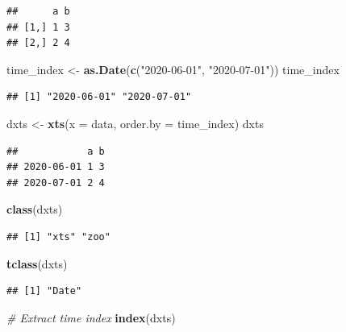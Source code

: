 \documentclass[
]{book}
\newenvironment{Shaded}{\begin{snugshade}}{\end{snugshade}}
\newcommand{\AttributeTok}[1]{\textcolor[rgb]{0.13,0.29,0.53}{#1}}
\newcommand{\CommentTok}[1]{\textcolor[rgb]{0.56,0.35,0.01}{\textit{#1}}}
\newcommand{\FunctionTok}[1]{\textcolor[rgb]{0.13,0.29,0.53}{\textbf{#1}}}
\newcommand{\NormalTok}[1]{#1}
\newcommand{\OtherTok}[1]{\textcolor[rgb]{0.56,0.35,0.01}{#1}}
\newcommand{\StringTok}[1]{\textcolor[rgb]{0.31,0.60,0.02}{#1}}
\begin{document}
\begin{verbatim}
##      a b
## [1,] 1 3
## [2,] 2 4
\end{verbatim}

\begin{Shaded}
\begin{Highlighting}[]
\NormalTok{time\_index }\OtherTok{\textless{}{-}} \FunctionTok{as.Date}\NormalTok{(}\FunctionTok{c}\NormalTok{(}\StringTok{"2020{-}06{-}01"}\NormalTok{, }\StringTok{"2020{-}07{-}01"}\NormalTok{))}
\NormalTok{time\_index}
\end{Highlighting}
\end{Shaded}

\begin{verbatim}
## [1] "2020-06-01" "2020-07-01"
\end{verbatim}

\begin{Shaded}
\begin{Highlighting}[]
\NormalTok{dxts }\OtherTok{\textless{}{-}} \FunctionTok{xts}\NormalTok{(}\AttributeTok{x =}\NormalTok{ data, }\AttributeTok{order.by =}\NormalTok{ time\_index)}
\NormalTok{dxts}
\end{Highlighting}
\end{Shaded}

\begin{verbatim}
##            a b
## 2020-06-01 1 3
## 2020-07-01 2 4
\end{verbatim}

\begin{Shaded}
\begin{Highlighting}[]
\FunctionTok{class}\NormalTok{(dxts)}
\end{Highlighting}
\end{Shaded}

\begin{verbatim}
## [1] "xts" "zoo"
\end{verbatim}

\begin{Shaded}
\begin{Highlighting}[]
\FunctionTok{tclass}\NormalTok{(dxts)}
\end{Highlighting}
\end{Shaded}

\begin{verbatim}
## [1] "Date"
\end{verbatim}

\begin{Shaded}
\begin{Highlighting}[]
\CommentTok{\# Extract time index}
\FunctionTok{index}\NormalTok{(dxts)}
\end{Highlighting}
\end{Shaded}
\end{document}
